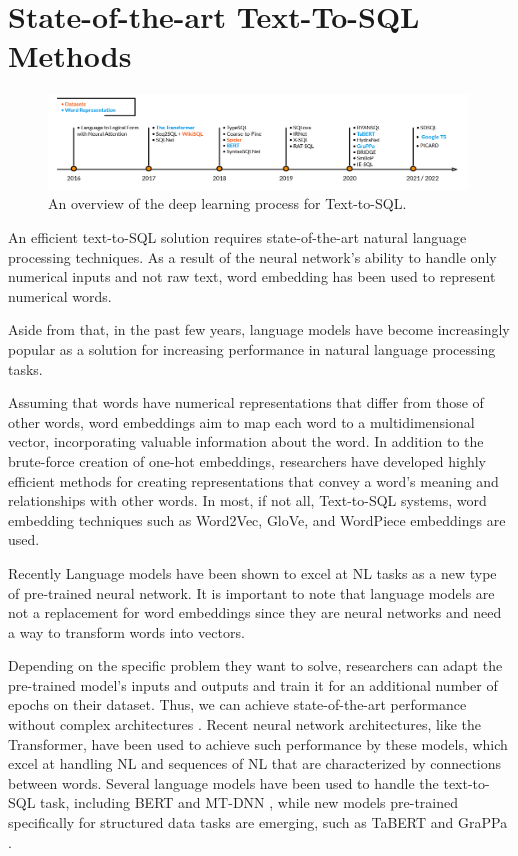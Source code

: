 \section{State-of-the-art Text-To-SQL Methods}

\begin{figure}[htb]
    \centering
    \includegraphics[width=0.99\textwidth]{pics/Timeline.png}
    \caption{An overview of the deep learning process for Text-to-SQL.}
    \label{fig:timeline}
\end{figure}

An efficient text-to-SQL solution requires state-of-the-art natural language processing techniques.
As a result of the neural network's ability to handle only numerical inputs and not raw text, word embedding has been used to represent numerical words.

Aside from that, in the past few years, language models have become increasingly popular as a solution for increasing performance in natural language processing tasks.

Assuming that words have numerical representations that differ from those of other words, word embeddings aim to map each word to a multidimensional vector, incorporating valuable information about the word. In addition to the brute-force creation of one-hot embeddings, researchers have developed highly efficient methods for creating representations that convey a word's meaning and relationships with other words. In most, if not all, Text-to-SQL systems, word embedding techniques such as Word2Vec\cite{DBLP:journals/corr/Rong14}, GloVe, and WordPiece embeddings\cite{DBLP:journals/corr/WuSCLNMKCGMKSJL16} are used.

Recently Language models have been shown to excel at NL tasks as a new type of pre-trained neural network. It is important to note that language models are not a replacement for word embeddings since they are neural networks and need a way to transform words into vectors.

Depending on the specific problem they want to solve, researchers can adapt the pre-trained model's inputs and outputs and train it for an additional number of epochs on their dataset. Thus, we can achieve state-of-the-art performance without complex architectures \cite{DBLP:journals/corr/abs-1810-04805}. Recent neural network architectures, like the Transformer\cite{DBLP:journals/corr/VaswaniSPUJGKP17}, have been used to achieve such performance by these models, which excel at handling NL and sequences of NL that are characterized by connections between words. Several language models have been used to handle the text-to-SQL task, including BERT \cite{DBLP:journals/corr/abs-1810-04805} and MT-DNN \cite{DBLP:journals/corr/abs-1901-11504}, while new models pre-trained specifically for structured data tasks are emerging, such as TaBERT\cite{DBLP:journals/corr/abs-2005-08314} and GraPPa \cite{DBLP:journals/corr/abs-2009-13845}.

